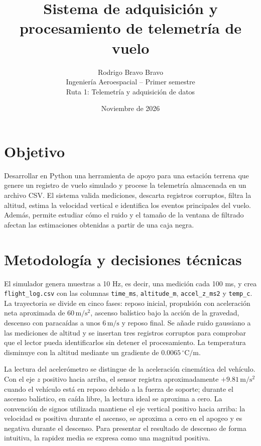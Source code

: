 \documentclass[9pt,a4paper]{extarticle}
\title{\vspace{-1.5em}\textbf{Sistema de adquisición y procesamiento de telemetría de vuelo}}
\author{
Rodrigo Bravo Bravo\\
Ingeniería Aeroespacial -- Primer semestre\\
Ruta 1: Telemetría y adquisición de datos
}
\date{Noviembre de 2026}
\begin{document}
\maketitle
\vspace{-2em}

\section{Objetivo}
Desarrollar en Python una herramienta de apoyo para una estación terrena que genere un registro de vuelo simulado y procese la telemetría almacenada en un archivo CSV. El sistema valida mediciones, descarta registros corruptos, filtra la altitud, estima la velocidad vertical e identifica los eventos principales del vuelo. Además, permite estudiar cómo el ruido y el tamaño de la ventana de filtrado afectan las estimaciones obtenidas a partir de una caja negra.

\section{Metodología y decisiones técnicas}

El simulador genera muestras a 10 Hz, es decir, una medición cada 100 ms, y crea \texttt{flight\_log.csv} con las columnas \texttt{time\_ms}, \texttt{altitude\_m}, \texttt{accel\_z\_ms2} y \texttt{temp\_c}. La trayectoria se divide en cinco fases: reposo inicial, propulsión con aceleración neta aproximada de \(60\,\mathrm{m/s^2}\), ascenso balístico bajo la acción de la gravedad, descenso con paracaídas a unos \(6\,\mathrm{m/s}\) y reposo final. Se añade ruido gaussiano a las mediciones de altitud y se insertan tres registros corruptos para comprobar que el lector pueda identificarlos sin detener el procesamiento. La temperatura disminuye con la altitud mediante un gradiente de \(0.0065\,^\circ\mathrm{C/m}\).

La lectura del acelerómetro se distingue de la aceleración cinemática del vehículo. Con el eje \(z\) positivo hacia arriba, el sensor registra aproximadamente \(+9.81\,\mathrm{m/s^2}\) cuando el vehículo está en reposo debido a la fuerza de soporte; durante el ascenso balístico, en caída libre, la lectura ideal se aproxima a cero. La convención de signos utilizada mantiene el eje vertical positivo hacia arriba: la velocidad es positiva durante el ascenso, se aproxima a cero en el apogeo y es negativa durante el descenso. Para presentar el resultado de descenso de forma intuitiva, la rapidez media se expresa como una magnitud positiva.
\end{document}
